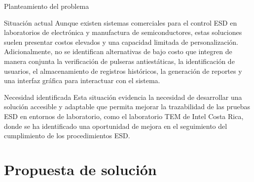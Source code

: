 \documentclass[aspectratio=169]{beamer}
\newcommand{\rightfootertext}{}
\newcommand{\setrightfooter}[1]{\gdef\rightfootertext{#1}}
\begin{document}
\begin{frame}{Planteamiento del problema}

    \begin{block}{Situación actual}
        \justifying
        Aunque existen sistemas comerciales para el control ESD en laboratorios de electrónica y
        manufactura de semiconductores, estas soluciones suelen presentar costos elevados y una
        capacidad limitada de personalización. Adicionalmente, no se identifican alternativas de
        bajo costo que integren de manera conjunta la verificación de pulseras antiestáticas, la
        identificación de usuarios, el almacenamiento de registros históricos, la generación de
        reportes y una interfaz gráfica para interactuar con el sistema.
    \end{block}

    \vspace{0.25cm}

    \begin{alertblock}{Necesidad identificada}
        \justifying
        Esta situación evidencia la necesidad de desarrollar una solución accesible y adaptable que
        permita mejorar la trazabilidad de las pruebas ESD en entornos de laboratorio, como el
        laboratorio TEM de Intel Costa Rica, donde se ha identificado una oportunidad de mejora
        en el seguimiento del cumplimiento de los procedimientos ESD.
    \end{alertblock}

\end{frame}


\setrightfooter{}
\section{Propuesta de solución}
\end{document}
